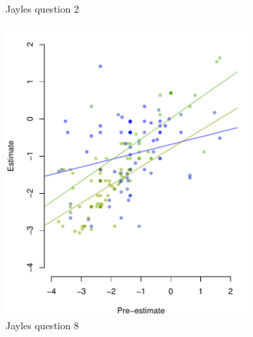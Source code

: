 \documentclass[9pt,twoside,lineno]{pnas-new}
\begin{document}
\begin{figure}[htbp]
\begin{subfigure}[b]{.24\textwidth}
		\caption{Jayles question 2}
	\end{subfigure}
		\begin{subfigure}[b]{.24\textwidth}
		\includegraphics[width=\textwidth]{../plots/jayles8_vs_xp.pdf}
		\caption{Jayles question 8}
	\end{subfigure}
	\begin{subfigure}[b]{.24\textwidth}

\end{subfigure}
\end{figure}
\end{document}
